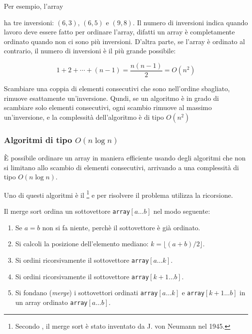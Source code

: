 Per esempio, l'array

\begin{center}
\end{center}
ha tre inversioni: $(6,3)$, $(6,5)$ e $(9,8)$.
Il numero di inversioni indica quando
lavoro deve essere fatto per ordinare l'array,
difatti un array è completamente ordinato 
quando non ci sono più inversioni.
D'altra parte, se l'array è ordinato al contrario,
il numero di inversioni è il più grande possibile:

\[1+2+\cdots+(n-1)=\frac{n(n-1)}{2} = O(n^2)\]

Scambiare una coppia di elementi consecutivi che sono
nell'ordine sbagliato, rimuove esattamente un'inversione.
Qundi, se un algoritmo è in grado di scambiare solo
elementi consecutivi, ogni scambio rimuove al massimo
un'inversione, e la complessità dell'algoritmo è di tipo $O(n^2)$

\subsubsection{Algoritmi di tipo $O(n \log n)$}


È possibile ordinare un array in maniera efficiente usando
degli algoritmi che non si limitano allo scambio di elementi
consecutivi, arrivando a una  complessità di tipo $O(n \log n)$.

Uno di questi algoritmi è il \footnote{Secondo \cite{knu983},
il merge sort è stato inventato da J. von Neumann nel 1945.}
e per risolvere il problema utilizza la ricorsione.

Il merge sort ordina un sottovettore \texttt{array}$[a \ldots b]$ nel modo seguente:

\begin{enumerate}
\item Se $a=b$ non si fa niente, perchè il sottovettore è già ordinato.
\item Si calcoli la posizione dell'elemento mediano: $k=\lfloor (a+b)/2 \rfloor$.
\item Si ordini ricorsivamente il sottovettore \texttt{array}$[a \ldots k]$.
\item Si ordini ricorsivamente il sottovettore \texttt{array}$[k+1 \ldots b]$.
\item Si fondano (\emph{merge}) i sottovettori ordinati \texttt{array}$[a \ldots k]$ e
\texttt{array}$[k+1 \ldots b]$
in un array ordinato \texttt{array}$[a \ldots b]$.
\end{enumerate}

